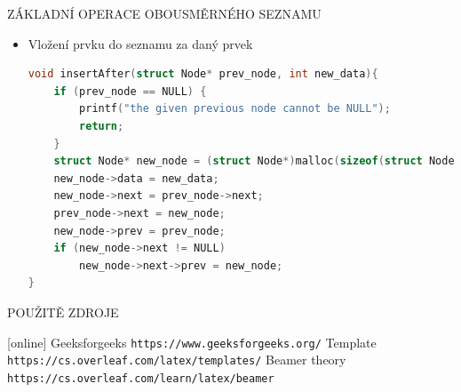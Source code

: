 \documentclass[9pt]{beamer}
\begin{document}
\begin{frame}[fragile]{ZÁKLADNÍ OPERACE OBOUSMĚRNÉHO SEZNAMU}
\begin{itemize}
\item Vložení prvku do seznamu za daný prvek
    \begin{lstlisting}[language=C]
void insertAfter(struct Node* prev_node, int new_data){
    if (prev_node == NULL) {
        printf("the given previous node cannot be NULL");
        return;
    }
    struct Node* new_node = (struct Node*)malloc(sizeof(struct Node));
    new_node->data = new_data;
    new_node->next = prev_node->next;
    prev_node->next = new_node;
    new_node->prev = prev_node;
    if (new_node->next != NULL)
        new_node->next->prev = new_node;
}
    \end{lstlisting}
\end{itemize}
\end{frame}




\begin{frame}{POUŽITĚ ZDROJE}
\begin{thebibliography}{}
[online]
\bibitem[Geeksforgeeks]{} Geeksforgeeks
\newblock \texttt{https://www.geeksforgeeks.org/}
\bibitem[Overleaf]{} Template
\newblock \texttt{https://cs.overleaf.com/latex/templates/}
\bibitem[Overleaf]{} Beamer theory
\newblock \texttt{https://cs.overleaf.com/learn/latex/beamer}
\end{thebibliography}
\end{frame}
\end{document}

